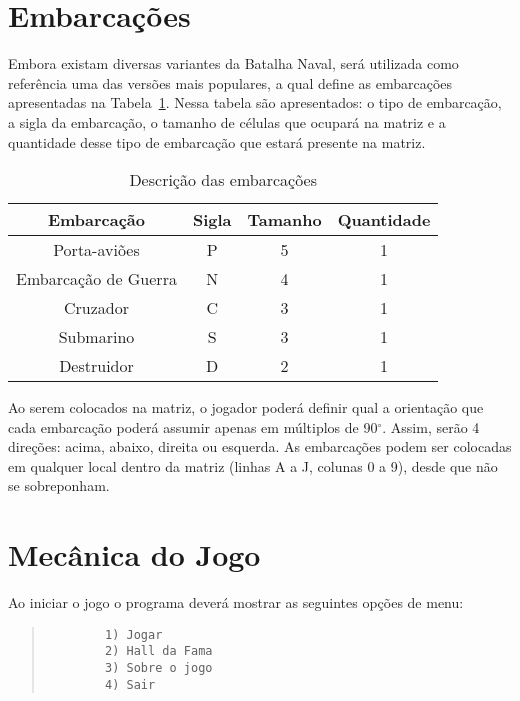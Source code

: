 \documentclass[defesa,oneside]{ppginf}
\begin{document}
\section{Embarcações}

Embora existam diversas variantes da Batalha Naval, será utilizada como referência uma das versões mais populares, a qual define as embarcações apresentadas na Tabela~\ref{tab:embarcações}. Nessa tabela são apresentados: o tipo de embarcação, a sigla da embarcação, o tamanho de células que ocupará na matriz e a quantidade desse tipo de embarcação que estará presente na matriz.

\begin{table}[!htbp]
	\centering
	\caption{Descrição das embarcações}
	\label{tab:embarcações}
	\begin{tabular}{c|c|c|c}
		\hline
		\textbf{Embarcação}  & \textbf{Sigla} & \textbf{Tamanho} & \textbf{Quantidade} \\ \hline
		    Porta-aviões     &       P        &        5         &          1          \\ \hline
		Embarcação de Guerra &       N        &        4         &          1          \\ \hline
		      Cruzador       &       C        &        3         &          1          \\ \hline
		     Submarino       &       S        &        3         &          1          \\ \hline
		     Destruidor      &       D        &        2         &          1          \\ \hline
	\end{tabular}
\end{table}


Ao serem colocados na matriz, o jogador poderá definir qual a orientação que cada embarcação poderá assumir apenas em múltiplos de 90$^{\circ}$. Assim, serão 4 direções: acima, abaixo, direita ou esquerda. As embarcações podem ser colocadas em qualquer local dentro da matriz (linhas A a J, colunas 0 a 9), desde que não se sobreponham.

\section{Mecânica do Jogo}

Ao iniciar o jogo o programa deverá mostrar as seguintes opções de menu:

\begin{quote}
	\begin{footnotesize}
		\begin{verbatim}
		1) Jogar
		2) Hall da Fama
		3) Sobre o jogo
		4) Sair
		\end{verbatim}		
	\end{footnotesize}
\end{quote}
\end{document}
